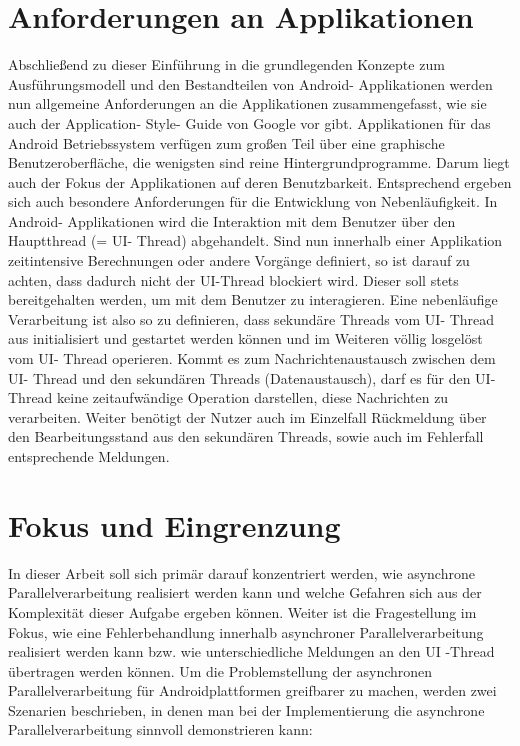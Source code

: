 \documentclass[12pt,oneside,a4paper,bibtotoc,liststotoc]{scrreprt}
\begin{document}
\section{Anforderungen an Applikationen}
Abschließend zu dieser Einführung in die grundlegenden Konzepte zum Ausführungsmodell und den Bestandteilen von Android- Applikationen werden nun allgemeine Anforderungen an die Applikationen zusammengefasst, wie sie auch der Application- Style- Guide von Google vor gibt.
Applikationen für das Android Betriebssystem verfügen zum großen Teil über eine graphische Benutzeroberfläche, die wenigsten sind reine Hintergrundprogramme. Darum liegt auch der Fokus der Applikationen auf deren Benutzbarkeit. Entsprechend ergeben sich auch besondere Anforderungen für die Entwicklung von Nebenläufigkeit. In Android- Applikationen wird die Interaktion mit dem Benutzer über den Hauptthread (= UI- Thread) abgehandelt. Sind nun innerhalb einer Applikation zeitintensive Berechnungen oder andere Vorgänge definiert, so ist darauf zu achten, dass dadurch nicht der UI-Thread blockiert wird. Dieser soll stets bereitgehalten werden, um mit dem Benutzer zu interagieren. Eine nebenläufige Verarbeitung ist also so zu definieren, dass sekundäre Threads vom UI- Thread aus initialisiert und gestartet werden können und im Weiteren völlig losgelöst vom UI- Thread operieren. Kommt es zum Nachrichtenaustausch zwischen dem UI- Thread und den sekundären Threads (Datenaustausch), darf es für den UI- Thread keine zeitaufwändige Operation darstellen, diese Nachrichten zu verarbeiten. Weiter benötigt der Nutzer auch im Einzelfall Rückmeldung über den Bearbeitungsstand aus den sekundären Threads, sowie auch im Fehlerfall entsprechende Meldungen.

\section{Fokus und Eingrenzung}
In dieser Arbeit soll sich primär darauf konzentriert werden, wie asynchrone Parallelverarbeitung realisiert werden kann und welche Gefahren sich aus der Komplexität dieser Aufgabe ergeben können. Weiter ist die Fragestellung im Fokus, wie eine Fehlerbehandlung innerhalb asynchroner Parallelverarbeitung realisiert werden kann bzw. wie unterschiedliche Meldungen an den UI -Thread übertragen werden können. Um die Problemstellung der asynchronen Parallelverarbeitung für Androidplattformen greifbarer zu machen, werden zwei Szenarien beschrieben, in denen man bei der Implementierung die asynchrone Parallelverarbeitung sinnvoll demonstrieren kann:
\end{document}
